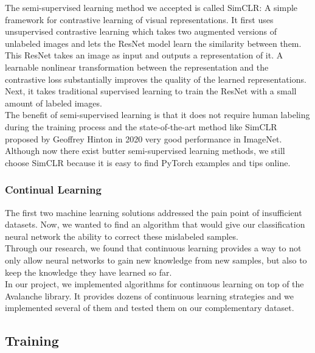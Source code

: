 \documentclass[lang=english,inputenc=utf8,fontsize=10pt]{ldvarticle}
\begin{document}
The semi-supervised learning method we accepted is called SimCLR: A simple framework for contrastive learning of visual representations. It first uses unsupervised contrastive learning which takes two augmented versions of unlabeled images and lets the ResNet model learn the similarity between them. This ResNet takes an image as input and outputs a representation of it. A learnable nonlinear transformation between the representation and the contrastive loss substantially improves the quality of the learned representations. Next, it takes traditional supervised learning to train the ResNet with a small amount of labeled images.\\

The benefit of semi-supervised learning is that it does not require human labeling during the training process and the state-of-the-art method like SimCLR proposed by 
Geoffrey Hinton in 2020 very good performance in ImageNet. Although now there exist butter semi-supervised learning methods, we still choose SimCLR because it is easy to find PyTorch examples and tips online.

\subsubsection{Continual Learning}
The first two machine learning solutions addressed the pain point of insufficient datasets. Now, we wanted to find an algorithm that would give our classification neural network the ability to correct these mislabeled samples.\\

Through our research, we found that continuous learning provides a way to not only allow neural networks to gain new knowledge from new samples, but also to keep the knowledge they have learned so far.\\

In our project, we implemented algorithms for continuous learning on top of the Avalanche library. It provides dozens of continuous learning strategies and we implemented several of them and tested them on our complementary dataset.\\


\subsection{Training}
\end{document}
